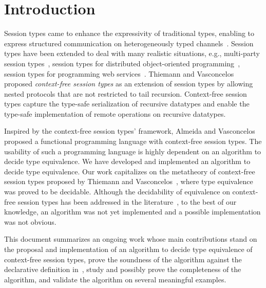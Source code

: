\section{Introduction}
\label{sec:introduction}

Session types came to enhance the expressivity of traditional types, enabling to express structured communication on heterogeneously typed channels~\cite{DBLP:conf/concur/Honda93,DBLP:conf/parle/TakeuchiHK94}. Session types have been extended to deal with many realistic situations, e.g., multi-party session types~\cite{DBLP:conf/popl/HondaYC08}, session types for distributed object-oriented programming~\cite{DBLP:conf/popl/GayVRGC10}, session types for programming web services~\cite{DBLP:journals/toplas/CarboneHY12}. Thiemann and Vasconcelos~\cite{thiemann2016context} proposed {\it context-free session types} as an extension of session types by allowing nested protocols that are not restricted to tail recursion. Context-free session types capture the type-safe serialization of recursive datatypes and enable the type-safe implementation of remote operations on recursive datatypes. 

Inspired by the context-free session types' framework, Almeida and
Vasconcelos~\cite{bernardo} proposed a functional programming language
with context-free session types. The usability of such a programming
language is highly dependent on an algorithm to decide type
equivalence. We have developed and implemented an algorithm to decide
type equivalence. Our work capitalizes on the metatheory of
context-free session types proposed by Thiemann and
Vasconcelos~\cite{thiemann2016context}, where type equivalence was
proved to be decidable. Although the decidability of equivalence on
context-free session types has been addressed in the
literature~\cite{DBLP:journals/iandc/ChristensenHS95,janvcar1999techniques,thiemann2016context},
to the best of our knowledge, an algorithm was not yet implemented and
a possible implementation was not obvious.

This document summarizes an ongoing work whose main contributions
stand on the proposal and implementation of an algorithm to decide
type equivalence of context-free session types, prove the soundness of
the algorithm against the declarative definition
in~\cite{thiemann2016context}, study and possibly prove the
completeness of the algorithm, and validate the algorithm on several
meaningful examples.


